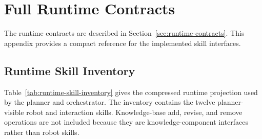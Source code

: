 \chapter{Full Runtime Contracts}
\label{chap:appendix}

The runtime contracts are described in Section~\ref{sec:runtime-contracts}. This appendix provides a compact reference for the implemented skill interfaces.

\section{Runtime Skill Inventory}
\label{sec:runtime-skill-inventory}

Table~\ref{tab:runtime-skill-inventory} gives the compressed runtime projection used by the planner and orchestrator. The inventory contains the twelve planner-visible robot and interaction skills. Knowledge-base add, revise, and remove operations are not included because they are knowledge-component interfaces rather than robot skills.

